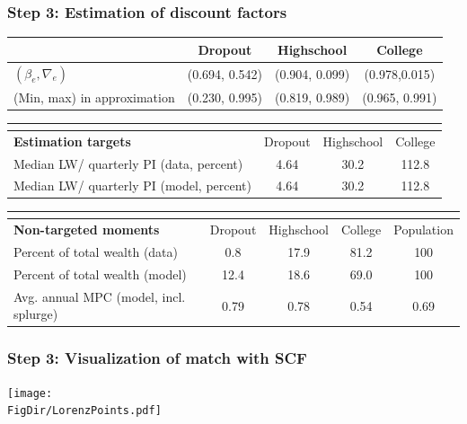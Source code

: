 \documentclass[pdflatex,aspectratio=169]{beamer}
\begin{document}
{\begin{frame}
	\frametitle{Step 3: Estimation of discount factors}
	\begin{tabular}{lccc}
		& Dropout & Highschool & College \\ \midrule
		$(\beta_e, \nabla_e)$ & (0.694, 0.542) & (0.904, 0.099) & (0.978,0.015) \\
		(Min, max) in approximation & (0.230, 0.995) & (0.819, 0.989) & (0.965, 0.991) \\
		\midrule 
	\end{tabular} 
	\begin{tabular}{lccc}
		\multicolumn{4}{l}{ } \\ \midrule
		\textbf{Estimation targets} & Dropout & Highschool & College \\ \midrule
		Median LW/ quarterly PI (data, percent) & 4.64 & 30.2 & 112.8 \\ 
		Median LW/ quarterly PI (model, percent) & 4.64 & 30.2 & 112.8 %
		\\ \midrule 
	\end{tabular} 
	\begin{tabular}{lcccc}
		\multicolumn{5}{l}{ } \\ \midrule
		\textbf{Non-targeted moments} & Dropout & Highschool & College & Population \\ \midrule
		Percent of total wealth (data) & 0.8 & 17.9 & 81.2 & 100 \\
		Percent of total wealth (model) & 12.4 & 18.6 & 69.0 & 100 \\
		Avg. annual MPC (model, incl. splurge) & 0.79 & 0.78 & 0.54 & 0.69
		\\ \bottomrule 
	\end{tabular}
\end{frame}




\begin{frame}
	\frametitle{Step 3: Visualization of match with SCF}
	\centering
	\texttt{[image: \\FigDir/LorenzPoints.pdf]}
\end{frame}


}{}
\end{document}
